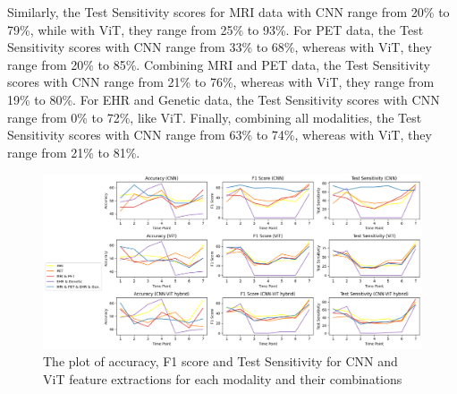 Similarly, the Test Sensitivity scores for MRI data with CNN range from 20\% to 79\%, while with ViT, they range from 25\% to 93\%. For PET data, the Test Sensitivity scores with CNN range from 33\% to 68\%, whereas with ViT, they range from 20\% to 85\%. Combining MRI and PET data, the Test Sensitivity scores with CNN range from 21\% to 76\%, whereas with ViT, they range from 19\% to 80\%. For EHR and Genetic data, the Test Sensitivity scores with CNN range from 0\% to 72\%, like ViT. Finally, combining all modalities, the Test Sensitivity scores with CNN range from 63\% to 74\%, whereas with ViT, they range from 21\% to 81\%. 

\begin{figure}
    \centering
    \includegraphics[width=1\linewidth]{figs/Picture17_1.png}
    \caption{The plot of accuracy, F1 score and Test Sensitivity for CNN and ViT feature extractions for each modality and their combinations }
    \label{fig:enter-label}
\end{figure}